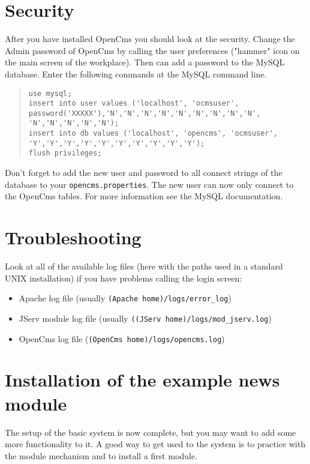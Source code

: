 \section{Security}

After you have installed OpenCms you should look at the security.
Change the Admin password of OpenCms by calling the user preferences 
("hammer" icon on the main screen of the workplace). 
Then can add a password to the MySQL database. Enter the following commands 
at the MySQL command line.\\ 

\begin{quote}
\begin{verbatim}
use mysql;
insert into user values ('localhost', 'ocmsuser',
password('XXXXX'),'N','N','N','N','N','N','N','N','N',
'N','N','N','N','N'); 
insert into db values ('localhost', 'opencms', 'ocmsuser',
'Y','Y','Y','Y','Y','Y','Y','Y','Y','Y'); 
flush privileges; 
\end{verbatim}
\end{quote}

Don't forget to add the new user and password to all connect strings 
of the database to your \texttt{opencms.properties}. 
The new user can now only connect to the OpenCms tables. 
For more information see the MySQL documentation. 

\section{Troubleshooting}

Look at all of the available log files 
(here with the paths used in a standard UNIX installation) 
if you have problems calling the login screen: 

\begin{itemize}
\item Apache log file (usually \texttt{(Apache home)/logs/error\_log})
\item JServ module log file (usually \texttt{((JServ home)/logs/mod\_jserv.log})
\item OpenCms log file (\texttt{(OpenCms home)/logs/opencms.log})
\end{itemize}

\section{Installation of the example news module}

The setup of the basic system is now complete, but you may want
to add some more functionality to it.
A good way to get used to the system is to practice with the 
module mechanism and to install a first module. 

